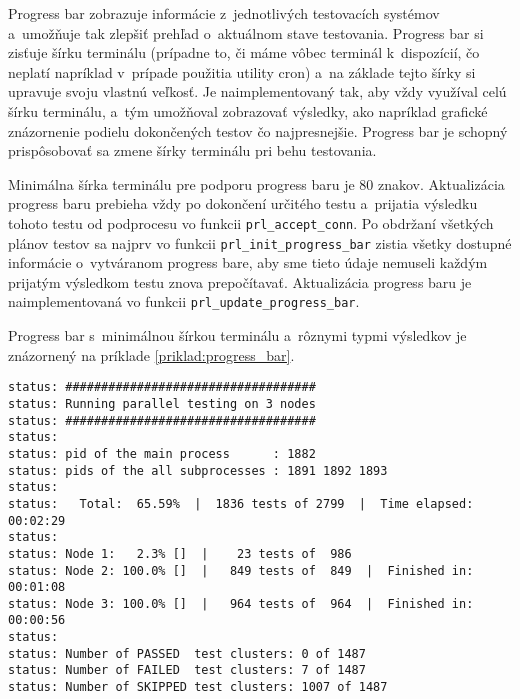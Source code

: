 Progress bar zobrazuje informácie z~jednotlivých testovacích systémov 
a~umožňuje tak zlepšiť prehľad o~aktuálnom stave testovania. 
Progress bar si zisťuje šírku terminálu (prípadne to, či máme vôbec 
terminál k~dispozícií, čo neplatí napríklad v~prípade použitia utility cron) 
a~na základe tejto šírky si upravuje svoju vlastnú veľkosť.
Je naimplementovaný tak, aby vždy využíval celú šírku terminálu, a~tým
umožňoval zobrazovať výsledky, ako napríklad grafické znázornenie podielu
dokončených testov čo najpresnejšie. Progress bar je schopný prispôsobovať
sa zmene šírky terminálu pri behu testovania.

Minimálna šírka terminálu pre podporu progress baru je 80 znakov.
Aktualizácia progress baru prebieha vždy po dokončení určitého testu
a~prijatia výsledku tohoto testu od podprocesu vo funkcii
\texttt{prl\_accept\_conn}. Po obdržaní všetkých plánov testov sa najprv 
vo funkcii \texttt{prl\_init\_progress\_bar} zistia všetky dostupné
informácie o~vytváranom progress bare, aby sme tieto údaje nemuseli 
každým prijatým výsledkom testu znova prepočítavať.
Aktualizácia progress baru je naimplementovaná vo funkcii 
\texttt{prl\_update\_progress\_bar}.

Progress bar s~minimálnou šírkou terminálu a~rôznymi 
typmi výsledkov je znázornený na príklade
\ref{priklad:progress_bar}.

\noindent\begin{minipage}{\textwidth}
\begin{lstlisting}[caption=Ukážka progress baru so šírkou terminálu 
80 znakov,label=priklad:progress_bar]
status: ###################################
status: Running parallel testing on 3 nodes
status: ###################################
status: 
status: pid of the main process      : 1882
status: pids of the all subprocesses : 1891 1892 1893
status: 
status:   Total:  65.59%  |  1836 tests of 2799  |  Time elapsed: 00:02:29      
status:                                                                         
status: Node 1:   2.3% []  |    23 tests of  986                                
status: Node 2: 100.0% []  |   849 tests of  849  |  Finished in: 00:01:08      
status: Node 3: 100.0% []  |   964 tests of  964  |  Finished in: 00:00:56      
status:                                                                         
status: Number of PASSED  test clusters: 0 of 1487                              
status: Number of FAILED  test clusters: 7 of 1487                              
status: Number of SKIPPED test clusters: 1007 of 1487
\end{lstlisting}
\end{minipage}


